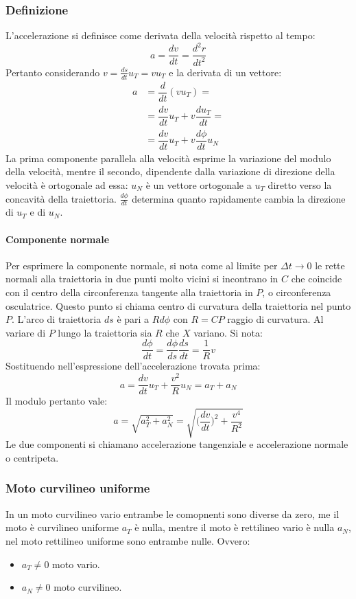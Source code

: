 		\subsubsection{Definizione}
		L'accelerazione si definisce come derivata della velocit\`a rispetto al tempo:
		$$a=\dfrac{dv}{dt}=\dfrac{d^2r}{dt^2}$$
		Pertanto considerando $v=\frac{ds}{dt}u_T=vu_T$ e la derivata di un vettore:
		\begin{align*}
			a&=\dfrac{d}{dt}(vu_T)=\\
			 &=\dfrac{dv}{dt}u_T+v\dfrac{du_T}{dt}=\\
			 &=\dfrac{dv}{dt}u_T+v\dfrac{d\phi}{dt}u_N
		\end{align*}
		La prima componente parallela alla velocit\`a esprime la variazione del modulo della velocit\`a, mentre il secondo, dipendente dalla variazione di direzione della velocit\`a \`e ortogonale ad essa: $u_N$ \`e un vettore ortogonale a $u_T$ diretto verso la concavit\`a della traiettoria.
		$\frac{d\phi}{dt}$ determina quanto rapidamente cambia la direzione di $u_T$ e di $u_N$.

			\paragraph{Componente normale}
			Per esprimere la componente normale, si nota come al limite per $\Delta t\rightarrow 0$ le rette normali alla traiettoria in due punti molto vicini si incontrano in $C$ che coincide con il centro della circonferenza tangente alla traiettoria in $P$, o circonferenza osculatrice.
			Questo punto si chiama centro di curvatura della traiettoria nel punto $P$.
			L'arco di traiettoria $ds$ \`e pari a $Rd\phi$ con $R=CP$ raggio di curvatura.
			Al variare di $P$ lungo la traiettoria sia $R$ che $X$ variano.
			Si nota:
			$$\dfrac{d\phi}{dt}=\dfrac{d\phi}{ds}\dfrac{ds}{dt}=\dfrac{1}{R}v$$
			Sostituendo nell'espressione dell'accelerazione trovata prima:
			$$a=\dfrac{dv}{dt}u_T+\dfrac{v^2}{R}u_N=a_T+a_N$$
			Il modulo pertanto vale:
			$$a=\sqrt{a^2_T+a^2_N}=\sqrt{\biggl(\dfrac{dv}{dt}\biggr)^2+\dfrac{v^4}{R^2}}$$
			Le due componenti si chiamano accelerazione tangenziale e accelerazione normale o centripeta.

		\subsubsection{Moto curvilineo uniforme}
		In un moto curvilineo vario entrambe le comopnenti sono diverse da zero, me il moto \`e curvilineo uniforme $a_T$ \`e nulla, mentre il moto \`e rettilineo vario \`e nulla $a_N$, nel moto rettilineo uniforme sono entrambe nulle.
		Ovvero:
		\begin{multicols}{2}
			\begin{itemize}
				\item $a_T\neq 0$ moto vario.
				\item $a_N\neq 0$ moto curvilineo.
			\end{itemize}
		\end{multicols}

